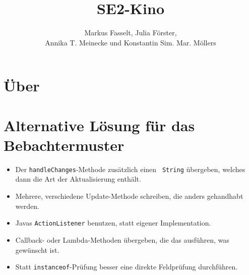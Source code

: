 \documentclass{scrartcl}
\title{SE2-Kino}
\author{
 Markus {\sc Fasselt},
 Julia {\sc F\"orster}, \\
 Annika T. {\sc Meinecke} und 
 Konstantin Sim. Mar. {\sc Möllers}
}
\begin{document}
 
\maketitle
\tableofcontents
\section{Über}

\section{Alternative Lösung für das Bebachtermuster}
\begin{itemize}
	\item Der {\tt handleChanges}-Methode zusätzlich einen {\tt 
String} übergeben, welches dann die Art der Aktualisierung enthält.
	\item Mehrere, verschiedene Update-Methode schreiben, die anders 
gehandhabt werden.
	\item Javas {\tt ActionListener} benutzen, statt eigener 
Implementation.
	\item Callback- oder Lambda-Methoden übergeben, die das 
ausführen, was gewünscht ist.
	\item Statt {\tt instanceof}-Prüfung besser eine direkte 
Feldprüfung durchführen.
\end{itemize}
\end{document}
